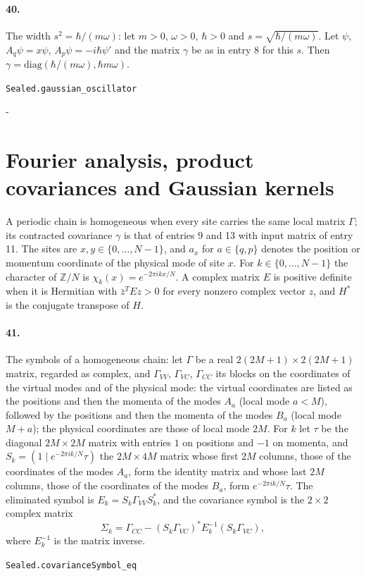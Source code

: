 \documentclass[11pt]{article}
\makeatletter
\newcommand{\keepspace}[1]{\par\penalty-100\begingroup\setlength{\dimen@}{#1}\dimen@ii\pagegoal\advance\dimen@ii-\pagetotal\ifdim\dimen@>\dimen@ii\ifdim\dimen@ii>\z@\vfil\fi\break\fi\endgroup}
\makeatother
\begin{document}
\paragraph{40.} The width $s^2 = \hbar/(m\omega)$: let $m > 0$, $\omega > 0$, $\hbar > 0$ and $s = \sqrt{\hbar/(m\omega)}$. Let $\psi$, $A_q\psi = x\psi$, $A_p\psi = -i\hbar\psi'$ and the matrix $\gamma$ be as in entry 8 for this $s$. Then $\gamma = \mathrm{diag}(\hbar/(m\omega), \hbar m\omega)$.\par{\footnotesize\texttt{Sealed.gaussian\_oscillator}}

\keepspace{14\baselineskip}\section*{Fourier analysis, product covariances and Gaussian kernels}
A periodic chain is homogeneous when every site carries the same local matrix $\Gamma$; its contracted covariance $\gamma$ is that of entries 9 and 13 with input matrix of entry 11. The sites are $x, y \in \{0, \dots, N - 1\}$, and $a_x$ for $a \in \{q, p\}$ denotes the position or momentum coordinate of the physical mode of site $x$. For $k \in \{0, \dots, N - 1\}$ the character of $\mathbb Z/N$ is $\chi_k(x) = e^{-2\pi i k x/N}$. A complex matrix $E$ is positive definite when it is Hermitian with $\bar z^T E z > 0$ for every nonzero complex vector $z$, and $H^*$ is the conjugate transpose of $H$.

\paragraph{41.} The symbols of a homogeneous chain: let $\Gamma$ be a real $2(2M+1) \times 2(2M+1)$ matrix, regarded as complex, and $\Gamma_{VV}$, $\Gamma_{VC}$, $\Gamma_{CC}$ its blocks on the coordinates of the virtual modes and of the physical mode: the virtual coordinates are listed as the positions and then the momenta of the modes $A_a$ (local mode $a < M$), followed by the positions and then the momenta of the modes $B_a$ (local mode $M + a$); the physical coordinates are those of local mode $2M$. For $k$ let $\tau$ be the diagonal $2M \times 2M$ matrix with entries $1$ on positions and $-1$ on momenta, and $S_k = (1 \mid e^{-2\pi i k/N}\tau)$ the $2M \times 4M$ matrix whose first $2M$ columns, those of the coordinates of the modes $A_a$, form the identity matrix and whose last $2M$ columns, those of the coordinates of the modes $B_a$, form $e^{-2\pi i k/N}\tau$. The eliminated symbol is $E_k = S_k \Gamma_{VV} S_k^*$, and the covariance symbol is the $2 \times 2$ complex matrix \[\Sigma_k = \Gamma_{CC} - (S_k\Gamma_{VC})^* E_k^{-1} (S_k\Gamma_{VC}),\] where $E_k^{-1}$ is the matrix inverse.\par{\footnotesize\texttt{Sealed.covarianceSymbol\_eq}}
\end{document}
